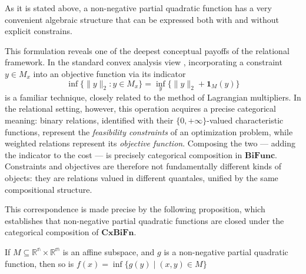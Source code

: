 As it is stated above, a non-negative partial quadratic function has a very convenient algebraic
structure that can be expressed both with and without explicit constrains.

This formulation reveals one of the deepest conceptual payoffs of the relational framework.  In the standard convex analysis view \cite{boyd2004convex}, incorporating a constraint
$y \in M_x$ into an objective function via its indicator
\[
\inf\{\|y\|_2 : y\in M_x\}
=
\inf_y \big\{\|y\|_2 + \mathbf{1}_{M}(y) \big\}
\]
is a familiar technique, closely related to the method of Lagrangian multipliers.  In the relational setting, however, this operation acquires a precise categorical meaning:
binary relations, identified with their $\{0,+\infty\}$-valued characteristic functions,  represent the \emph{feasibility constraints} of an optimization problem, while weighted
relations represent its \emph{objective function}. Composing the two --- adding the  indicator to the cost --- is precisely categorical composition in $\mathbf{BiFunc}$.
Constraints and objectives are therefore not fundamentally different kinds of objects:  they are relations valued in different quantales, unified by the same compositional
structure.

This correspondence is made precise by the following proposition, which  establishes that non-negative partial quadratic functions are closed under  the categorical composition of $\mathbf{CxBiFn}$.

\begin{proposition}\label{prop:partial quadratic composition}
    If $M \subseteq \mathbb{R^n} \times \mathbb{R^m}$ is an affine subspace, and $g$ is a non-negative partial quadratic function, then so is $f(x) = \inf \{g(y)\; |\;(x,y)\in M\} $
\end{proposition}

